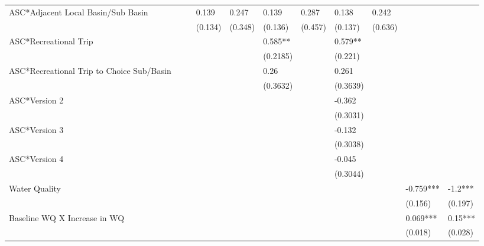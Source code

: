 \begin{table}[ht]
\begin{tabular}{lllllllllll}
  ASC*Adjacent Local Basin/Sub Basin &  &  & 0.139 & 0.247 & 0.139 & 0.287 & 0.138 & 0.242 &  &  \\ 
   &  &  & (0.134) & (0.348) & (0.136) & (0.457) & (0.137) & (0.636) &  &  \\ 
  ASC*Recreational Trip &  &  &  &  & 0.585** &  & 0.579** &  &  &  \\ 
   &  &  &  &  & (0.2185) &  & (0.221) &  &  &  \\ 
  ASC*Recreational Trip to Choice Sub/Basin &  &  &  &  & 0.26 &  & 0.261 &  &  &  \\ 
   &  &  &  &  & (0.3632) &  & (0.3639) &  &  &  \\ 
  ASC*Version 2 &  &  &  &  &  &  & -0.362 &  &  &  \\ 
   &  &  &  &  &  &  & (0.3031) &  &  &  \\ 
  ASC*Version 3 &  &  &  &  &  &  & -0.132 &  &  &  \\ 
   &  &  &  &  &  &  & (0.3038) &  &  &  \\ 
  ASC*Version 4 &  &  &  &  &  &  & -0.045 &  &  &  \\ 
   &  &  &  &  &  &  & (0.3044) &  &  &  \\ 
  Water Quality &  &  &  &  &  &  &  &  & -0.759*** & -1.2*** \\ 
   &  &  &  &  &  &  &  &  & (0.156) & (0.197) \\ 
  Baseline WQ X Increase in WQ &  &  &  &  &  &  &  &  & 0.069*** & 0.15*** \\ 
   &  &  &  &  &  &  &  &  & (0.018) & (0.028) \\ 
   \hline
\end{tabular}
\end{table}
